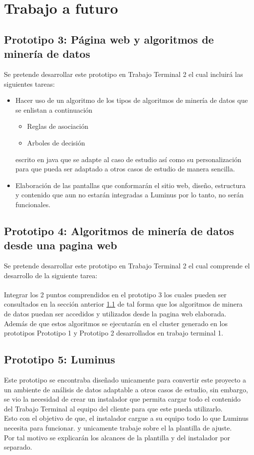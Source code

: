 \section{Trabajo a futuro}
\subsection{Prototipo 3: Página web y algoritmos de minería de datos}
\label{proto3}
Se pretende desarrollar este prototipo en Trabajo Terminal 2 el cual incluirá las siguientes tareas:
\begin{itemize}
	\item Hacer uso de un algoritmo de los tipos de algoritmos de minería de datos que se enlistan a continuación
	\begin{itemize}
		\item Reglas de asociación
		\item Arboles de decisión
	\end{itemize}
	 escrito en java que se adapte al caso de estudio así como su personalización para que pueda ser adaptado a otros casos de estudio de manera sencilla.
	\item Elaboración de las pantallas que conformarán el sitio web, diseño, estructura y contenido que aun no estarán integradas a Luminus por lo tanto, no serán funcionales.  
\end{itemize}
\subsection{Prototipo 4: Algoritmos de minería de datos desde una pagina web}
Se pretende desarrollar este prototipo en Trabajo Terminal 2 el cual comprende el desarrollo de la siguiente tarea:
\\ 
\\ 
Integrar los 2 puntos comprendidos en el prototipo 3 los cuales pueden ser consultados en la sección anterior \ref{proto3} de tal forma que los algoritmos de minera de datos puedan ser accedidos y utilizados desde la pagina web elaborada. 
\\
Además de que estos algoritmos se ejecutarán en el cluster generado en los prototipos Prototipo 1  y Prototipo 2  desarrollados en trabajo terminal 1.
\subsection{Prototipo 5: Luminus}
Este prototipo se encontraba diseñado unicamente para convertir este proyecto a un ambiente de análisis de datos adaptable a otros casos de estudio, sin embargo, se vio la necesidad de crear un instalador que permita cargar todo el contenido del Trabajo Terminal al equipo del cliente para que este pueda utilizarlo.\\
Esto con el objetivo de que, el instalador cargue a su equipo todo lo que Luminus necesita para funcionar. y unicamente trabaje sobre el la plantilla de ajuste. \\
Por tal motivo se explicarán los alcances de la plantilla y del instalador por separado.

